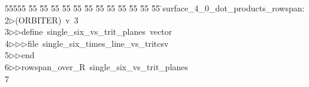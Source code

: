 %
%
\begin{tabbing}
55555 \= 55 \= 55 \= 55 \= 55 \= 55 \= 55 \= 55 \= 55 \= 55 \= 55 \= 55 \= 55 \= \>surface\_4\_0\_dot\_products\_rowspan:\\[0pt]
2\>$\triangleright$\>(ORBITER)\ v\ 3\ \\[0pt]
3\>$\triangleright$\>$\triangleright$\>define\ single\_six\_vs\_trit\_planes\ vector\ \\[0pt]
4\>$\triangleright$\>$\triangleright$\>$\triangleright$\>file\ single\_six\_times\_line\_vs\_tritcsv\ \\[0pt]
5\>$\triangleright$\>$\triangleright$\>end\ \\[0pt]
6\>$\triangleright$\>$\triangleright$\>rowspan\_over\_R\ single\_six\_vs\_trit\_planes\\[0pt]
7\>\end{tabbing}
